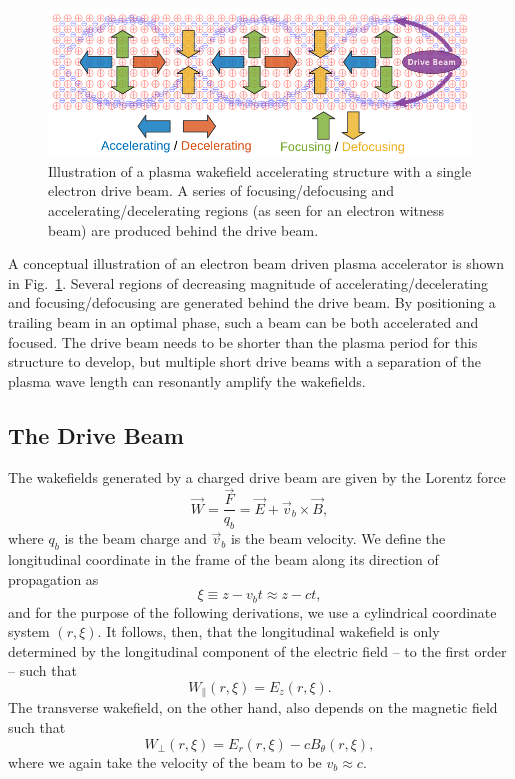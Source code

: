 \begin{figure}[hbt]
    \centering
    \includegraphics[width=0.85\linewidth,trim={0mm 0mm 0mm 0mm},clip]{figures/PlasmaWakefield}
    \caption{\label{Fig:PWFA:Illust} Illustration of a plasma wakefield accelerating structure with a single electron drive beam. A series of focusing/defocusing and accelerating/decelerating regions (as seen for an electron witness beam) are produced behind the drive beam.}
\end{figure}

A conceptual illustration of an electron beam driven plasma accelerator is shown in Fig.~\ref{Fig:PWFA:Illust}. Several regions of decreasing magnitude of accelerating/decelerating and focusing/defocusing are generated behind the drive beam. By positioning a trailing beam in an optimal phase, such a beam can be both accelerated and focused. The drive beam needs to be shorter than the plasma period for this structure to develop, but multiple short drive beams with a separation of the plasma wave length can resonantly amplify the wakefields.

\subsection{The Drive Beam}
\label{Int:BPI:Drive}

The wakefields generated by a charged drive beam are given by the Lorentz force
\begin{equation}
    \vec{W} = \frac{\vec{F}}{q_{b}} = \vec{E} + \vec{v}_{b} \times \vec{B}, \label{EQ:Lorentz}
\end{equation}
where $q_{b}$ is the beam charge and $\vec{v}_{b}$ is the beam velocity. We define the longitudinal coordinate in the frame of the beam along its direction of propagation as
\begin{equation}
    \xi \equiv z - v_{b}t \approx z - ct, \label{EQ:Xi}
\end{equation}
and for the purpose of the following derivations, we use a cylindrical coordinate system $(r, \xi)$. It follows, then, that the longitudinal wakefield is only determined by the longitudinal component of the electric field -- to the first order -- such that
\begin{equation}
    W_{\parallel}(r,\xi) = E_{z}(r,\xi). \label{EQ:Wz}
\end{equation}
The transverse wakefield, on the other hand, also depends on the magnetic field such that
\begin{equation}
    W_{\perp}(r,\xi) = E_{r}(r,\xi) - cB_{\theta}(r,\xi), \label{EQ:Wr}
\end{equation}
where we again take the velocity of the beam to be $v_{b} \approx c$.

